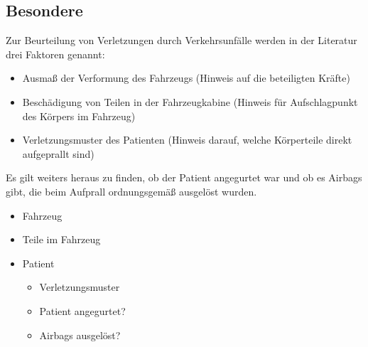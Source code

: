 \subsection{Besondere }


{ Zur Beurteilung von Verletzungen durch Verkehrsunfälle
werden in der Literatur drei Faktoren genannt:
\begin{itemize}
  \item Ausmaß der Verformung des Fahrzeugs (Hinweis auf die
  beteiligten Kräfte)
  \item Beschädigung von Teilen in der
  Fahrzeugkabine (Hinweis für Aufschlagpunkt des Körpers im
  Fahrzeug) 
  \item Verletzungsmuster des
  Patienten (Hinweis darauf,
  welche Körperteile direkt aufgeprallt sind)
\end{itemize}
Es gilt weiters heraus zu finden, ob der Patient angegurtet
war und ob es Airbags gibt, die beim Aufprall ordnungsgemäß
ausgelöst wurden. 
\cite{ITLSde6,RedelsteinerHRNS1}
}{
\begin{itemize}
  \item Fahrzeug
  \item Teile im Fahrzeug
  \item Patient
  \begin{itemize}
    \item Verletzungsmuster
    \item Patient angegurtet?
    \item Airbags ausgelöst?
  \end{itemize}
\end{itemize}
}{}{}{}



